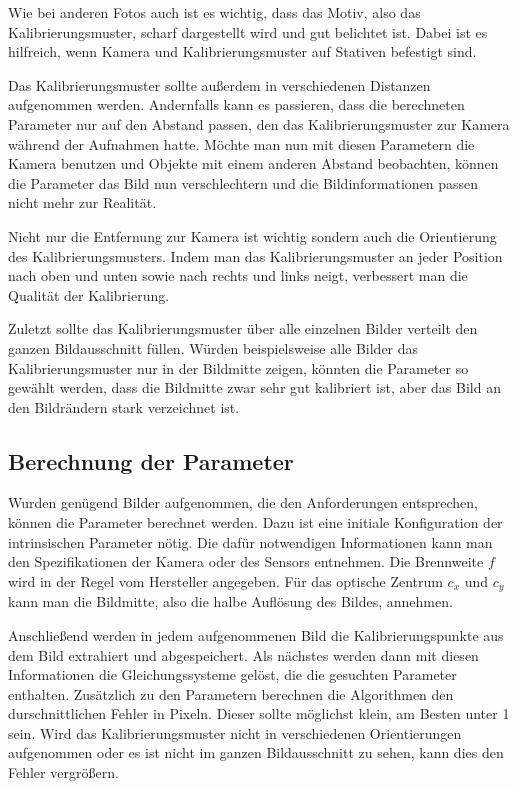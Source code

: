 Wie bei anderen Fotos auch ist es wichtig, dass das Motiv, also das Kalibrierungsmuster, scharf dargestellt wird und gut belichtet ist. Dabei ist es hilfreich, wenn Kamera und Kalibrierungsmuster auf Stativen befestigt sind. 

Das Kalibrierungsmuster sollte außerdem in verschiedenen Distanzen aufgenommen werden. Andernfalls kann es passieren, dass die berechneten Parameter nur auf den Abstand passen, den das Kalibrierungsmuster zur Kamera während der Aufnahmen hatte. Möchte man nun mit diesen Parametern die Kamera benutzen und Objekte mit einem anderen Abstand beobachten, können die Parameter das Bild nun verschlechtern und die Bildinformationen passen nicht mehr zur Realität.

Nicht nur die Entfernung zur Kamera ist wichtig sondern auch die Orientierung des Kalibrierungsmusters. Indem man das Kalibrierungsmuster an jeder Position nach oben und unten sowie nach rechts und links neigt, verbessert man die Qualität der Kalibrierung.

Zuletzt sollte das Kalibrierungsmuster über alle einzelnen Bilder verteilt den ganzen Bildausschnitt füllen. Würden beispielsweise alle Bilder das Kalibrierungsmuster nur in der Bildmitte zeigen, könnten die Parameter so gewählt werden, dass die Bildmitte zwar sehr gut kalibriert ist, aber das Bild an den Bildrändern stark verzeichnet ist. 

\subsection{Berechnung der Parameter} %
\label{sub:berechnung_der_parameter}
Wurden genügend Bilder aufgenommen, die den Anforderungen entsprechen, können die Parameter berechnet werden. Dazu ist eine initiale Konfiguration der intrinsischen Parameter nötig. Die dafür notwendigen Informationen kann man den Spezifikationen der Kamera oder des Sensors entnehmen. Die Brennweite $f$ wird in der Regel vom Hersteller angegeben. Für das optische Zentrum $c_x$ und $c_y$ kann man die Bildmitte, also die halbe Auflösung des Bildes, annehmen.

Anschließend werden in jedem aufgenommenen Bild die Kalibrierungspunkte aus dem Bild extrahiert und abgespeichert. Als nächstes werden dann mit diesen Informationen die Gleichungssysteme gelöst, die die gesuchten Parameter enthalten. Zusätzlich zu den Parametern berechnen die Algorithmen den durschnittlichen Fehler in Pixeln. Dieser sollte möglichst klein, am Besten unter 1 sein. Wird das Kalibrierungsmuster nicht in verschiedenen Orientierungen aufgenommen oder es ist nicht im ganzen Bildausschnitt zu sehen, kann dies den Fehler vergrößern.

